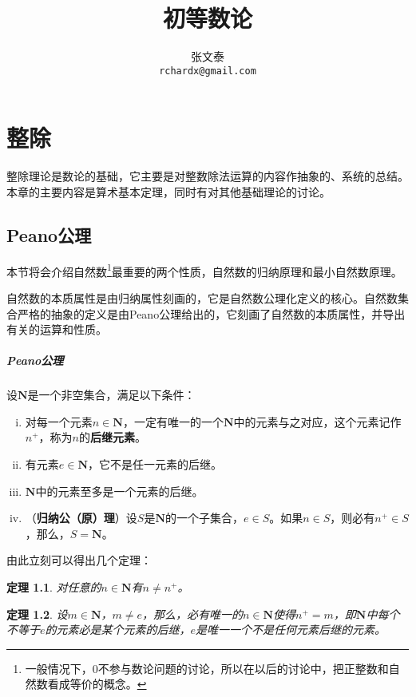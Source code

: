 \documentclass{ctexrep}
\newcommand{\bbold}[1]{\textbf{#1}}
\newcommand{\N}{\boldsymbol{N}}
\newtheorem{thrm}{定理}[section]
\begin{document}
\title{初等数论}
\author{张文泰\\ \texttt{rchardx@gmail.com}}
\date{\version}
\maketitle

\tableofcontents

\chapter{整除}
整除理论是数论的基础，它主要是对整数除法运算的内容作抽象的、系统的总结。本章的主要内容是算术基本定理，同时有对其他基础理论的讨论。

\section{Peano公理}
本节将会介绍自然数\footnote{一般情况下，$0$不参与数论问题的讨论，所以在以后的讨论中，把正整数和自然数看成等价的概念。}最重要的两个性质，自然数的归纳原理和最小自然数原理。

自然数的本质属性是由归纳属性刻画的，它是自然数公理化定义的核心。自然数集合严格的抽象的定义是由Peano公理给出的，它刻画了自然数的本质属性，并导出有关的运算和性质。

\paragraph{Peano公理}
设$\N$是一个非空集合，满足以下条件：
\begin{enumerate}[(i)]
\item 对每一个元素$n \in \N$，一定有唯一的一个$\N$中的元素与之对应，这个元素记作$n^{+}$，称为$n$的\bbold{后继元素}。
\item 有元素$e \in \N$，它不是任一元素的后继。
\item $\N$中的元素至多是一个元素的后继。
\item （\bbold{归纳公（原）理}）设$S$是$\N$的一个子集合，$e \in S$。如果$n \in S$，则必有$n^{+}  \in S$，那么，$S = \N$。
\end{enumerate}

由此立刻可以得出几个定理：
\begin{thrm}
对任意的$n \in \N$有$n \neq n^+$。
\end{thrm}

\begin{thrm}
设$m \in \N$，$m \neq e$，那么，必有唯一的$n \in \N$使得$n^+=m$，即$\N$中每个不等于$e$的元素必是某个元素的后继，$e$是唯一一个不是任何元素后继的元素。
\end{thrm}
\end{document}
